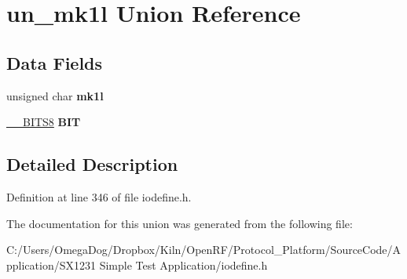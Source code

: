 \hypertarget{unionun__mk1l}{\section{un\-\_\-mk1l Union Reference}
\label{unionun__mk1l}
}
\subsection*{Data Fields}
\begin{DoxyCompactItemize}
\item 
\hypertarget{unionun__mk1l_a43878b0710ec6ccae32744423f84e802}{unsigned char {\bfseries mk1l}}\label{unionun__mk1l_a43878b0710ec6ccae32744423f84e802}

\item 
\hypertarget{unionun__mk1l_ad34c0fa5b7bf84c8eaf13442da6e1df4}{\hyperlink{struct_____b_i_t_s8}{\-\_\-\-\_\-\-B\-I\-T\-S8} {\bfseries B\-I\-T}}\label{unionun__mk1l_ad34c0fa5b7bf84c8eaf13442da6e1df4}

\end{DoxyCompactItemize}


\subsection{Detailed Description}


Definition at line 346 of file iodefine.\-h.



The documentation for this union was generated from the following file\-:\begin{DoxyCompactItemize}
\item 
C\-:/\-Users/\-Omega\-Dog/\-Dropbox/\-Kiln/\-Open\-R\-F/\-Protocol\-\_\-\-Platform/\-Source\-Code/\-Application/\-S\-X1231 Simple Test Application/iodefine.\-h\end{DoxyCompactItemize}
